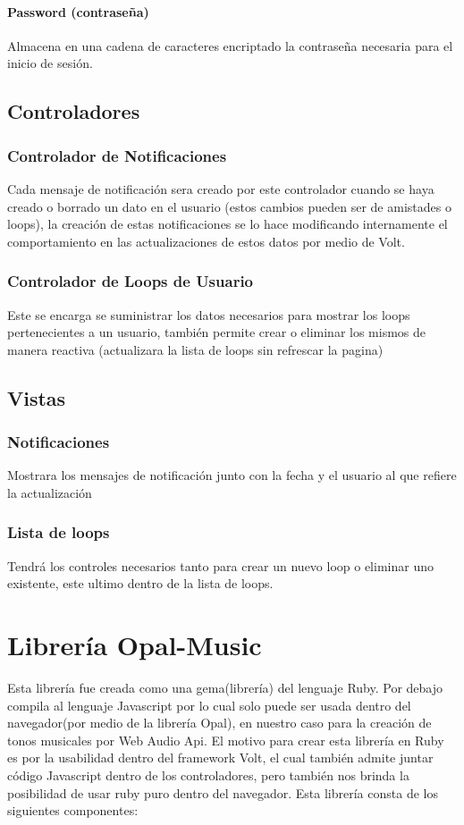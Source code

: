 \paragraph{Password (contraseña)}
Almacena en una cadena de caracteres encriptado la contraseña necesaria para
el inicio de sesión.

\subsection{Controladores}
\subsubsection{Controlador de Notificaciones}
Cada mensaje de notificación sera creado por este controlador cuando se haya creado
o borrado un dato en el usuario (estos cambios pueden ser de amistades o loops),
la creación de estas notificaciones se lo hace modificando internamente el comportamiento en las
actualizaciones de estos datos por medio de Volt.

\subsubsection{Controlador de Loops de Usuario}
Este se encarga se suministrar los datos necesarios para mostrar los
loops pertenecientes a un usuario, también permite crear o eliminar los
mismos de manera reactiva (actualizara la lista de loops sin refrescar
la pagina)

\subsection{Vistas}
\subsubsection{Notificaciones}
Mostrara los mensajes de notificación junto con la fecha y el usuario al
que refiere la actualización
\subsubsection{Lista de loops}
Tendrá los controles necesarios tanto para crear un nuevo loop o
eliminar uno existente, este ultimo dentro de la lista de loops.

\section{Librería Opal-Music}
Esta librería fue creada como una gema(librería) del lenguaje Ruby. Por
debajo compila al lenguaje Javascript por lo cual solo puede ser usada
dentro del navegador(por medio de la librería Opal), en nuestro caso
para la creación de tonos musicales por Web Audio Api. El motivo para
crear esta librería en Ruby es por la usabilidad dentro del framework
Volt, el cual también admite juntar código Javascript dentro de los
controladores, pero también nos brinda la posibilidad de usar ruby puro
dentro del navegador. Esta librería consta de los siguientes componentes:

